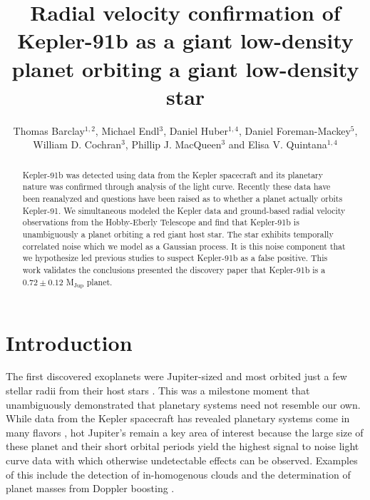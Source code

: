 \documentclass[apjl]{emulateapj}
\begin{document}
\title{Radial velocity confirmation of Kepler-91\lowercase{b} as a giant low-density planet orbiting a giant low-density star}
\author{Thomas Barclay$^{1,2}$, Michael Endl$^{3}$, Daniel Huber$^{1,4}$,  Daniel Foreman-Mackey$^{5}$, William D. Cochran$^{3}$, Phillip J. MacQueen$^{3}$ and Elisa V. Quintana$^{1,4}$}



\begin{abstract}
Kepler-91b was detected using data from the Kepler spacecraft and its planetary nature was confirmed through analysis of the light curve. Recently these data have been reanalyzed and questions have been raised as to whether a planet actually orbits Kepler-91. We simultaneous modeled the Kepler data and ground-based radial velocity observations from the Hobby-Eberly Telescope and find that Kepler-91b is unambiguously a planet orbiting a red giant host star. The star exhibits temporally correlated noise which we model as a Gaussian process. It is this noise component that we hypothesize led previous studies to suspect Kepler-91b as a false positive. This work validates the conclusions presented the discovery paper that Kepler-91b is a $0.72\pm0.12$ M$_{\textrm{Jup}}$ planet. 
\end{abstract}

\section{Introduction}
The first discovered exoplanets were Jupiter-sized \citep{campbell88} and most orbited just a few stellar radii from their host stars \citep{mayor95,marcy96}. This was a milestone moment that unambiguously demonstrated that planetary systems need not resemble our own. While data from the Kepler spacecraft has revealed planetary systems come in many flavors \citep[e.g.][]{lissauer11,carter12,barclay13}, hot Jupiter's remain a key area of interest because the large size of these planet and their short orbital periods yield the highest signal to noise light curve data with which otherwise undetectable effects can be observed. Examples of this include the detection of in-homogenous clouds \citep{demory13} and the determination of planet masses from Doppler boosting \citep{shporer11,barclay12}.
\end{document}

